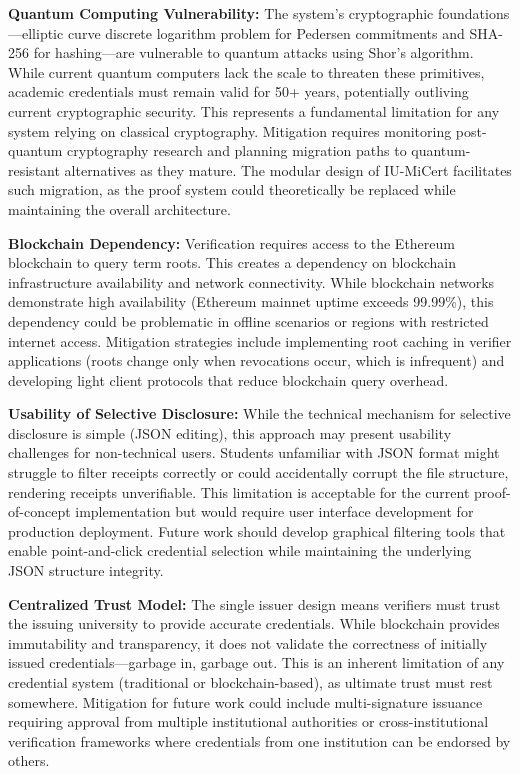 \textbf{Quantum Computing Vulnerability:} The system's cryptographic foundations—elliptic curve discrete logarithm problem for Pedersen commitments and SHA-256 for hashing—are vulnerable to quantum attacks using Shor's algorithm. While current quantum computers lack the scale to threaten these primitives, academic credentials must remain valid for 50+ years, potentially outliving current cryptographic security. This represents a fundamental limitation for any system relying on classical cryptography. Mitigation requires monitoring post-quantum cryptography research and planning migration paths to quantum-resistant alternatives as they mature. The modular design of IU-MiCert facilitates such migration, as the proof system could theoretically be replaced while maintaining the overall architecture.

\textbf{Blockchain Dependency:} Verification requires access to the Ethereum blockchain to query term roots. This creates a dependency on blockchain infrastructure availability and network connectivity. While blockchain networks demonstrate high availability (Ethereum mainnet uptime exceeds 99.99\%), this dependency could be problematic in offline scenarios or regions with restricted internet access. Mitigation strategies include implementing root caching in verifier applications (roots change only when revocations occur, which is infrequent) and developing light client protocols that reduce blockchain query overhead.

\textbf{Usability of Selective Disclosure:} While the technical mechanism for selective disclosure is simple (JSON editing), this approach may present usability challenges for non-technical users. Students unfamiliar with JSON format might struggle to filter receipts correctly or could accidentally corrupt the file structure, rendering receipts unverifiable. This limitation is acceptable for the current proof-of-concept implementation but would require user interface development for production deployment. Future work should develop graphical filtering tools that enable point-and-click credential selection while maintaining the underlying JSON structure integrity.

\textbf{Centralized Trust Model:} The single issuer design means verifiers must trust the issuing university to provide accurate credentials. While blockchain provides immutability and transparency, it does not validate the correctness of initially issued credentials—garbage in, garbage out. This is an inherent limitation of any credential system (traditional or blockchain-based), as ultimate trust must rest somewhere. Mitigation for future work could include multi-signature issuance requiring approval from multiple institutional authorities or cross-institutional verification frameworks where credentials from one institution can be endorsed by others.

